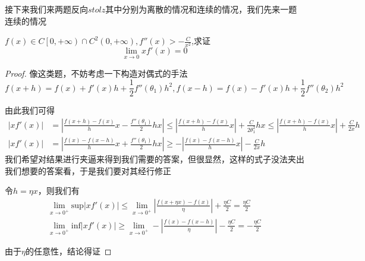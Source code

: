 \documentclass[lang=cn,10pt]{elegantbook}
\begin{document}
	接下来我们来两题反向$stolz$其中分别为离散的情况和连续的情况，我们先来一题连续的情况
	\begin{example}
	$	f\left( x \right) \in C\left[ 0,+\infty \right) \cap C^2\left( 0,+\infty \right) ,f''\left( x \right) >-\frac{C}{x^2}$,求证
	\begin{equation*}
		\lim_{x\rightarrow 0} xf'\left( x \right) =0
	\end{equation*}
   \end{example}
	\begin{proof}
		像这类题，不妨考虑一下构造对偶式的手法
		\begin{equation*}
			f\left( x+h \right) =f\left( x \right) +f'\left( x \right) h+\frac{1}{2}f''\left( \theta _1 \right) h^2,
			f\left( x-h \right) =f\left( x \right) -f'\left( x \right) h+\frac{1}{2}f''\left( \theta _2 \right) h^2
		\end{equation*}
		
		由此我们可得
		\begin{equation*}
			\begin{aligned}
				|xf'\left( x \right) |&=|\frac{f\left( x+h \right) -f\left( x \right)}{h}x-\frac{f''\left( \theta _1 \right)}{2}hx|\le |\frac{f\left( x+h \right) -f\left( x \right)}{h}x|+\frac{C}{2\theta _{1}^{2}}hx\le |\frac{f\left( x+h \right) -f\left( x \right)}{h}x|+\frac{C}{2x}h
				\\
				|xf'\left( x \right) |&=|\frac{f\left( x \right) -f\left( x-h \right)}{h}x+\frac{f''\left( \theta _1 \right)}{2}hx|\ge -|\frac{f\left( x \right) -f\left( x-h \right)}{h}x|-\frac{C}{2x}h
			\end{aligned}
		\end{equation*}
		我们希望对结果进行夹逼来得到我们需要的答案，但很显然，这样的式子没法夹出我们想要的答案看，于是我们要对其经行修正
		
		令$h=\eta x$，则我们有
		\begin{equation*}
			\begin{split}
				\lim_{x\rightarrow 0^+} \mathrm{sup}|xf'\left( x \right) |\le \lim_{x\rightarrow 0^+} |\frac{f\left( x+\eta x \right) -f\left( x \right)}{\eta}|+\frac{\eta C}{2}=\frac{\eta C}{2}
				\\
				\lim_{x\rightarrow 0^+} \mathrm{inf}|xf'\left( x \right) |\ge \lim_{x\rightarrow 0^+} -|\frac{f\left( x \right) -f\left( x-h \right)}{\eta}|-\frac{\eta C}{2}=-\frac{\eta C}{2}
			\end{split}
		\end{equation*}
		
		由于$\eta$的任意性，结论得证
	\end{proof}
	
\end{document}
